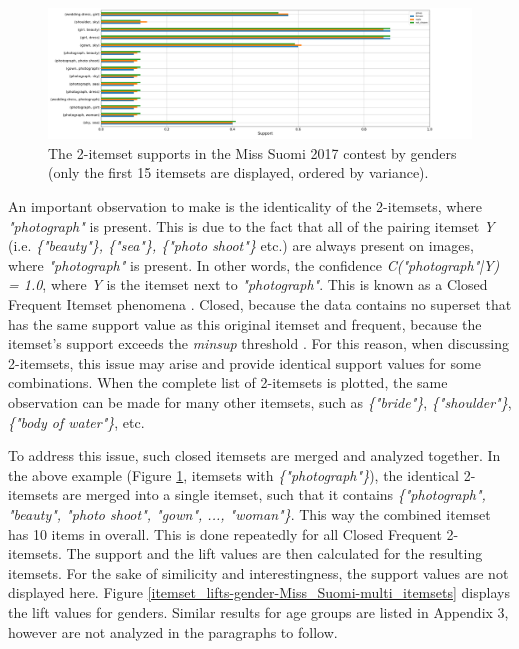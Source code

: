 \begin{figure}[h] 
    \begin{center}
        \includegraphics[width=1.2\textwidth,center]{Images/itemset_supports-gender-Miss_Helsinki-2_itemset.png}
        \caption{The 2-itemset supports in the Miss Suomi 2017 contest by genders (only the first 15 itemsets are displayed, ordered by variance).}
        \label{itemset_supports-gender-Miss_Helsinki-2_itemset}
    \end{center}
\end{figure}

An important observation to make is the identicality of the 2-itemsets, where \emph{"photograph"} is present. This is due to the fact that all of the pairing itemset \emph{Y} (i.e. \emph{\{"beauty"\}, \{"sea"\}, \{"photo shoot"\}} etc.) are always present on images, where \emph{"photograph"} is present. In other words, the confidence \emph{C("photograph"|Y) = 1.0}, where \emph{Y} is the itemset next to \emph{"photograph"}. This is known as a Closed Frequent Itemset phenomena \cite{introtodatamining}. Closed, because the data contains no superset that has the same support value as this original itemset and frequent, because the itemset's support exceeds the \emph{minsup} threshold \cite{introtodatamining}. For this reason, when discussing 2-itemsets, this issue may arise and provide identical support values for some combinations. When the complete list of 2-itemsets is plotted, the same observation can be made for many other itemsets, such as \emph{\{"bride"\}}, \emph{\{"shoulder"\}}, \emph{\{"body of water"\}}, etc. 

To address this issue, such closed itemsets are merged and analyzed together. In the above example (Figure \ref{itemset_supports-gender-Miss_Helsinki-2_itemset}, itemsets with \emph{\{"photograph"\}}), the identical 2-itemsets are merged into a single itemset, such that it contains \emph{\{"photograph", "beauty", "photo shoot", "gown", ..., "woman"\}}. This way the combined itemset has 10 items in overall. This is done repeatedly for all Closed Frequent 2-itemsets. The support and the lift values are then calculated for the resulting itemsets. For the sake of similicity and interestingness, the support values are not displayed here. Figure \ref{itemset_lifts-gender-Miss_Suomi-multi_itemsets} displays the lift values for genders. Similar results for age groups are listed in Appendix 3, however are not analyzed in the paragraphs to follow.

